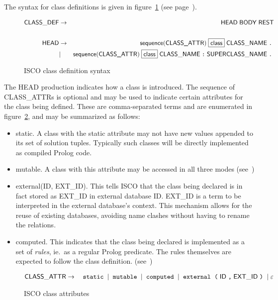 The syntax for class definitions is given in figure~\ref{fig:syntax:class}
(see page~\pageref{fig:syntax:class}).
\begin{figure}[htb]
  \centering
  \begin{eqnarray*}
    \mathsf{CLASS\_DEF} & \rightarrow & \mathsf{HEAD} \; \mathsf{BODY} \;
    \mathsf{REST} \\
    \\
    \mathsf{HEAD} & \rightarrow & \mathsf{sequence}(\textsf{CLASS\_ATTR}) \;
    \fbox{\textsf{class}} \; \mathsf{CLASS\_NAME} \;\texttt{.}\; \\
    & | & \mathsf{sequence}(\textsf{CLASS\_ATTR}) \; \fbox{\textsf{class}} \;
    \mathsf{CLASS\_NAME} \;\texttt{:}\; \mathsf{SUPERCLASS\_NAME} \;\texttt{.}\; \\
  \end{eqnarray*}
  \caption{ISCO class definition syntax}
  \label{fig:syntax:class}
\end{figure}
The \textsf{HEAD} production indicates how a class is introduced.  The
sequence of \textsf{CLASS\_ATTR}s is optional and may be used to indicate
certain attributes for the class being defined.  These are comma-separated
terms and are enumerated in figure~\ref{fig:syntax:class-attr}, and may be
summarized as follows:
\begin{itemize}
\item \textsf{static}.  A class with the \textsf{static} attribute may not
  have new values appended to its set of solution tuples.  Typically such
  classes will be directly implemented as compiled Prolog code.
\item \textsf{mutable}.  A class with this attribute may be accessed in all
  three modes (see~)  \TBD
\item \textsf{external(ID, EXT\_ID)}.  This tells ISCO that the class being
  declared is in fact stored as \textsf{EXT\_ID} in external database
  \textsf{ID}.  \textsf{EXT\_ID} is a term to be interpreted in the external
  database's context.  This mechanism allows for the reuse of existing
  databases, avoiding name clashes without having to rename the relations.
\item \textsf{computed}.  This indicates that the class being declared is
  implemented as a set of \emph{rules}, ie.~as a regular Prolog predicate.
  The rules themselves are expected to follow the class definition. (see~\TBD)
\end{itemize}
\begin{figure}[htb]
  \centering
  \begin{eqnarray*}
    \mathsf{CLASS\_ATTR} & \rightarrow & \;\texttt{static}\; \;|\; \;\texttt{mutable}\;
    \;|\; \;\texttt{computed}\; \;|\; \;\texttt{external}\;\;\texttt{(}\; \mathsf{ID}
    \;\texttt{,}\; \mathsf{EXT\_ID} \;\texttt{)}\; \;|\; \varepsilon
  \end{eqnarray*}
  \caption{ISCO class attributes}
  \label{fig:syntax:class-attr}
\end{figure}

